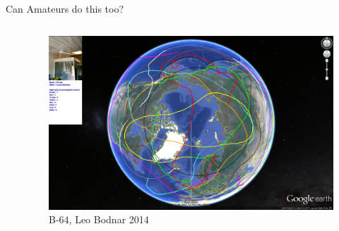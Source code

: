\documentclass{beamer}
\begin{document}
\begin{frame}{Can Amateurs do this too?}
\begin{columns}
\begin{column}{0.5\textwidth}
    \end{column}
    \begin{column}{0.5\textwidth}
      \begin{figure}[!ht]
        \includegraphics[width=1\textwidth]{B-64-all.jpg}
        \caption{B-64, Leo Bodnar 2014}
      \end{figure}
    \end{column}
  \end{columns}



\end{frame}

\end{document}
